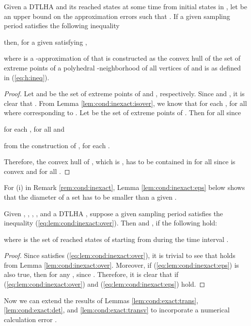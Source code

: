 \begin{lem} \label{lem:cond:inexact:over}
Given a DTLHA  and its reached states  at some time  from initial states in , 
let  be an upper bound on the approximation errors such that .
If a given sampling period  satisfies the following inequality 

then, for a given  satisfying , 

 where  is a -approximation of  that is  constructed as the convex hull of the set of extreme points of a polyhedral -neighborhood of all vertices of  and  is as defined in (\ref{eq:h:ineq}).
\end{lem}
\begin{proof}
Let  and  be the set of extreme points of  and , respectively. 
Since  and , it is clear that .
From Lemma \ref{lem:cond:inexact:isover}, we know that for each ,  for all  where  corresponding to .
Let  be the set of extreme points of . 
Then  for all  since 
\begin{inparaenum}[(i)]
	\item for each ,  for all  and 
	\item from the construction of ,  for each .
\end{inparaenum}
Therefore, the convex hull of , which is , has to be contained in  for all  since  is convex and  for all .
\end{proof}


For (i) in Remark \ref{rem:cond:inexact}, Lemma \ref{lem:cond:inexact:eps} below shows that the diameter of a set  has to be smaller than a given .



\begin{lem} \label{lem:cond:inexact:eps}
Given , , ,  , and a DTLHA , 
suppose a given sampling period  satisfies the inequality (\ref{eq:lem:cond:inexact:over}).
Then  and , if the following hold:

where  is the set of reached states of  starting from  during the time interval . 
\end{lem}
\begin{proof}
Since  satisfies (\ref{eq:lem:cond:inexact:over}), it is trivial to see that   holds from Lemma \ref{lem:cond:inexact:over}.
Moreover, if (\ref{eq:lem:cond:inexact:eps}) is also true, then for any ,  since .
Therefore, it is clear that  if (\ref{eq:lem:cond:inexact:over}) and (\ref{eq:lem:cond:inexact:eps}) hold.
\end{proof}


Now we can extend the results of Lemmas \ref{lem:cond:exact:trans}, \ref{lem:cond:exact:det}, and \ref{lem:cond:exact:transv} to incorporate a numerical calculation error .

